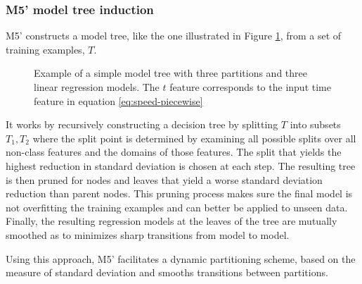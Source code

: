 \subsubsection{M5' model tree induction}
M5' constructs a model tree, like the one illustrated in Figure \ref{fig:model-tree}, from a set of training examples, $T$.
\begin{figure}[H]
	\centering
	\caption{Example of a simple model tree with three partitions and three linear regression models. The $t$ feature corresponds to the input time feature in equation \ref{eq:speed-piecewise}}
	\label{fig:model-tree}
\end{figure}
It works by recursively constructing a decision tree by splitting $T$ into subsets $T_1,T_2$ where the split point is determined by examining all possible splits over all non-class features and the domains of those features. The split that yields the highest reduction in standard deviation is chosen at each step.
The resulting tree is then pruned for nodes and leaves that yield a worse standard deviation reduction than parent nodes. This pruning process makes sure the final model is not overfitting the training examples and can better be applied to unseen data.
Finally, the resulting regression models at the leaves of the tree are mutually smoothed as to minimizes sharp transitions from model to model.

Using this approach, M5' facilitates a dynamic partitioning scheme, based on the measure of standard deviation and smooths transitions between partitions.

